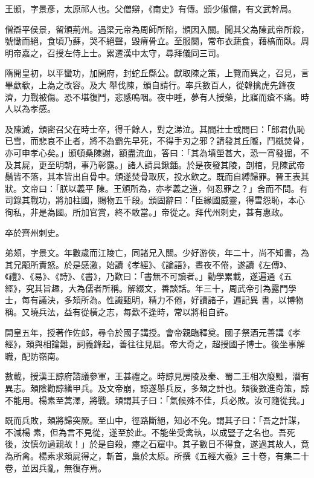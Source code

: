 \begin{pinyinscope}
 王頒，字景彥，太原祁人也。父僧辯，《南史》有傳。頒少俶儻，有文武幹局。



 僧辯平侯景，留頒荊州。遇梁元帝為周師所陷，頒因入關。聞其父為陳武帝所殺，號慟而絕，食頃乃蘇，哭不絕聲，毀瘠骨立。至服闋，常布衣蔬食，藉槁而臥。周明帝嘉之，召授左侍上士。累遷漢中太守，尋拜儀同三司。



 隋開皇初，以平蠻功，加開府，封蛇丘縣公。獻取陳之策，上覽而異之，召見，言畢歔欷，上為之改容。及大
 舉伐陳，頒自請行。率兵數百人，從韓擒虎先鋒夜濟，力戰被傷。恐不堪復鬥，悲感嗚咽。夜中睡，夢有人授藥，比寤而瘡不痛。時人以為孝感。



 及陳滅，頒密召父在時士卒，得千餘人，對之涕泣。其間壯士或問曰：「郎君仇恥已雪，而悲哀不止者，將不為霸先早死，不得手刃之邪？請發其丘隴，鬥櫬焚骨，亦可申孝心矣。」頒頓桑陳謝，額盡流血，答曰：「其為墳塋甚大，恐一宵發掘，不及其屍，更至明朝，事乃彰露。」諸人請具鍬鍤。於是夜發其陵，剖棺，見陳武帝鬚皆不落，其本皆出自骨中。頒遂焚骨取灰，投水飲之。既而自縛歸罪。晉王表其狀。文帝曰：「朕以義平
 陳。王頒所為，亦孝義之道，何忍罪之？」舍而不問。有司錄其戰功，將加柱國，賜物五千段。頒固辭曰：「臣緣國威靈，得雪怨恥，本心徇私，非是為國。所加官賞，終不敢當。」帝從之。拜代州刺史，甚有惠政。



 卒於齊州刺史。



 弟頍，字景文。年數歲而江陵亡，同諸兄入關。少好游俠，年二十，尚不知書，為其兄顒所責怒。於是感激，始讀《孝經》、《論語》，晝夜不倦，遂讀《左傳》、《禮》、《易》、《詩》、《書》，乃歎曰：「書無不可讀者。」勤學累載，遂遍通《五經》，究其旨趣，大為儒者所稱。解綴文，善談話。年三十，周武帝引為露門學士，每有議決，多頍所為。性識甄明，精力不倦，好讀諸子，遍記異
 書，以博物稱。又曉兵法，益有從橫之志，每歎不逢時，常以將相自許。



 開皇五年，授著作佐郎，尋令於國子講授。會帝親臨釋奠。國子祭酒元善講《孝經》，頍與相論難，詞義鋒起，善往往見屈。帝大奇之，超授國子博士。後坐事解職，配防嶺南。



 數載，授漢王諒府諮議參軍，王甚禮之。時諒見房陵及秦、蜀二王相次廢黜，潛有異志。頍陰勸諒繕甲兵。及文帝崩，諒遂舉兵反，多頍之計也。頍後數進奇策，諒不能用。楊素至蒿澤，將戰。頍謂其子曰：「氣候殊不佳，兵必敗。汝可隨從我。」



 既而兵敗，頍將歸突厥。至山中，徑路斷絕，知必不免。謂其子曰：「吾之計謀，不減楊
 素，但為言不見從，遂至於此。不能坐受禽執，以成豎子之名也。吾死後，汝慎勿過親故！」於是自殺，瘞之石窟中。其子數日不得食，遂過其故人，竟為所禽。楊素求頍屍得之，斬首，梟於太原。所撰《五經大義》三十卷，有集二十卷，並因兵亂，無復存焉。




\end{pinyinscope}

